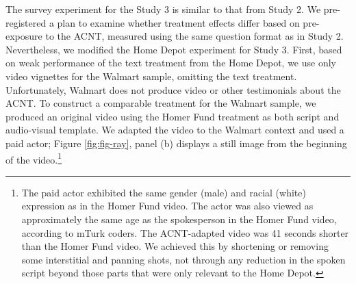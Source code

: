 \documentclass[
  11pt,
  oneside]{article}
\begin{document}
The survey experiment for the Study 3 is similar to that from Study 2. We pre-registered a plan to examine whether treatment effects differ based on pre-exposure to the ACNT, measured using the same question format as in Study 2. Nevertheless, we modified the Home Depot experiment for Study 3. First, based on weak performance of the text treatment from the Home Depot, we use only video vignettes for the Walmart sample, omitting the text treatment. Unfortunately, Walmart does not produce video or other testimonials about the ACNT. To construct a comparable treatment for the Walmart sample, we produced an original video using the Homer Fund treatment as both script and audio-visual template. We adapted the video to the Walmart context and used a paid actor; Figure \ref{fig:fig-ray}, panel (b) displays a still image from the beginning of the video.\footnote{The paid actor exhibited the same gender (male) and racial (white) expression as in the Homer Fund video. The actor was also viewed as approximately the same age as the spokesperson in the Homer Fund video, according to mTurk coders. The ACNT-adapted video was 41 seconds shorter than the Homer Fund video. We achieved this by shortening or removing some interstitial and panning shots, not through any reduction in the spoken script beyond those parts that were only relevant to the Home Depot.}
\end{document}
